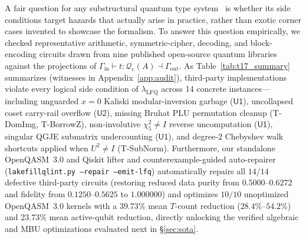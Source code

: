 \documentclass[acmsmall,screen,anonymous]{acmart}
\DeclareRobustCommand{\_}{\ifmmode\text{\char95}\else\char95\penalty0\relax\fi}
\theoremstyle{plain}
\begin{document}
A fair question for any substructural quantum type system~\cite{bichsel2020,yuan2022twist,cobble2026} is whether its side conditions target hazards that actually arise in practice, rather than exotic corner cases invented to showcase the formalism. To answer this question empirically, we checked representative arithmetic, symmetric-cipher, decoding, and block-encoding circuits drawn from nine published open-source quantum libraries~\cite{roetteler2017,haner2020,gidneyekera2021,parent2017reverc,zou2020,jaques2020,esser2022,jordan2024,harrigan2024,cobble2026} against the projections of $\Gamma_{\mathrm{in}} \vdash t : \mathcal{Q}_{e}(A) \dashv \Gamma_{\mathrm{out}}$. As Table~\ref{tab:t17_summary} summarizes (witnesses in Appendix~\ref{app:audit}), third-party implementations violate every logical side condition of $\lambda_{\mathrm{LFQ}}$ across 14 concrete instances---including unguarded $x=0$ Kaliski modular-inversion garbage ($\mathsf{U1}$), uncollapsed coset carry-rail overflow ($\mathsf{U2}$), missing Bruhat PLU permutation cleanup (\textsf{T-DomImg}, \textsf{T-BorrowZ}), non-involutive $\chi_5^2 \neq I$ reverse uncomputation ($\mathsf{U1}$), singular QGJE submatrix undercounting ($\mathsf{U1}$), and degree-$2$ Chebyshev walk shortcuts applied when $U^2 \neq I$ (\textsf{T-SubNorm}). Furthermore, our standalone OpenQASM~3.0 and Qiskit lifter and counterexample-guided auto-repairer (\texttt{lakefillq\_lint.py --repair --emit-lfq}) automatically repairs all $14/14$ defective third-party circuits (restoring reduced data purity from $0.5000$--$0.6272$ and fidelity from $0.1250$--$0.5625$ to $1.000000$) and optimizes $10/10$ unoptimized OpenQASM~3.0 kernels with a $39.73\%$ mean $T$-count reduction ($28.4\%$--$54.2\%$) and $23.73\%$ mean active-qubit reduction, directly unlocking the verified algebraic and MBU optimizations evaluated next in \S\ref{sec:sota}.
\end{document}
